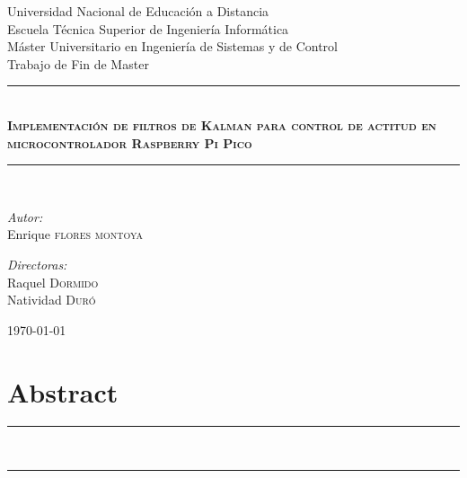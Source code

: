 \documentclass[a4paper,12pt]{book}
\begin{document}
\begin{titlepage}
\begin{figure}
\end{figure}


\begin{center}
{\large Universidad Nacional de Educación a Distancia}\\[0.5cm]
{\large Escuela Técnica Superior de Ingeniería Informática}\\[0.5cm]
{\large Máster Universitario en Ingeniería de Sistemas y de Control}\\[0.5cm]
{\large Trabajo de Fin de Master}\\[0.5cm]

\rule{\linewidth}{0.5mm} \\[0.4cm]
{ \huge \bfseries \textsc{Implementación de filtros de Kalman para control de actitud en microcontrolador Raspberry Pi Pico} \\[0.4cm] }
\rule{\linewidth}{0.5mm} \\[1.5cm]

\noindent
\begin{minipage}{0.4\textwidth}
  \begin{flushleft} \large
    \emph{Autor:}\\
Enrique \textsc{flores montoya}\\
  \end{flushleft}
\end{minipage}%
\begin{minipage}{0.4\textwidth}
  \begin{flushright} \large
    \emph{Directoras:} \\
    Raquel \textsc{Dormido}\\
    Natividad \textsc{Duró}
  \end{flushright}
\end{minipage}

\vfill

{\today}

\end{center}
\end{titlepage}
\frontmatter

\chapter*{Abstract}

\noindent\rule[2pt]{\textwidth}{0.5pt}\\



\noindent\rule[2pt]{\textwidth}{0.5pt}\\
\clearpage
\end{document}
